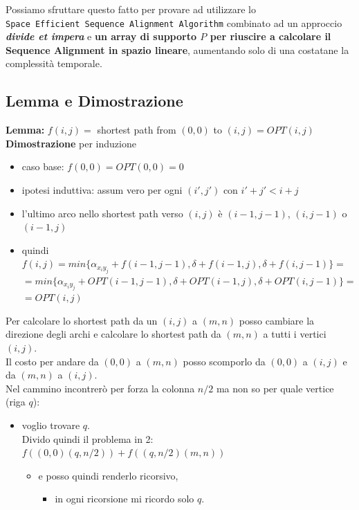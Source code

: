 Possiamo sfruttare questo fatto per provare ad utilizzare lo
\texttt{Space\ Efficient\ Sequence\ Alignment\ Algorithm} combinato ad
un approccio \emph{\textbf{divide et impera}} e \textbf{un array di
	supporto $P$ per riuscire a calcolare il Sequence Alignment in spazio
	lineare}, aumentando solo di una costatane la complessità temporale.

\subsection{Lemma e Dimostrazione}

\textbf{Lemma:} $f(i,j) =$ shortest path from $(0,0)$ to
$(i,j) = OPT(i,j)$\\
\textbf{Dimostrazione} per induzione
\begin{itemize}
	\item caso base:
	      $f(0,0) = OPT(0,0) = 0$
	\item ipotesi induttiva: assum vero per ogni
	      $(i', j')$ con $i'+j' < i+j$
	\item l'ultimo arco nello shortest path
	      verso $(i,j)$ è $(i-1, j-1)$, $(i, j-1)$ o $(i-1, j)$
	\item quindi
	      $f(i,j) = min\{ \alpha_{x_i y_j} + f(i-1, j-1), \delta + f(i-1, j), \delta +f(i, j-1)\} =$
	      $= min\{ \alpha_{x_i y_j} + OPT(i-1, j-1), \delta + OPT(i-1, j), \delta + OPT(i, j-1)\} =$
	      $= OPT(i,j)$
\end{itemize}

Per calcolare lo shortest path da un $(i,j)$ a $(m,n)$ posso
cambiare la direzione degli archi e calcolare lo shortest path da
$(m,n)$ a tutti i vertici $(i,j)$.\\

Il costo per andare da $(0,0)$ a $(m,n)$ posso scomporlo da
$(0,0)$ a $(i,j)$ e da $(m,n)$ a $(i,j)$.\\

Nel cammino incontrerò per forza la colonna $n/2$ ma non so per quale
vertice (riga $q$):
\begin{itemize}
	\item voglio trovare $q$.\\
	      Divido quindi il problema in 2:\\
	      $f((0,0)(q,n/2)) + f((q,n/2)(m,n))$
	      \begin{itemize}
		      \item e posso quindi renderlo ricorsivo,
		            \begin{itemize}
			            \item in ogni ricorsione mi ricordo solo $q$.
		            \end{itemize}
	      \end{itemize}
\end{itemize}

